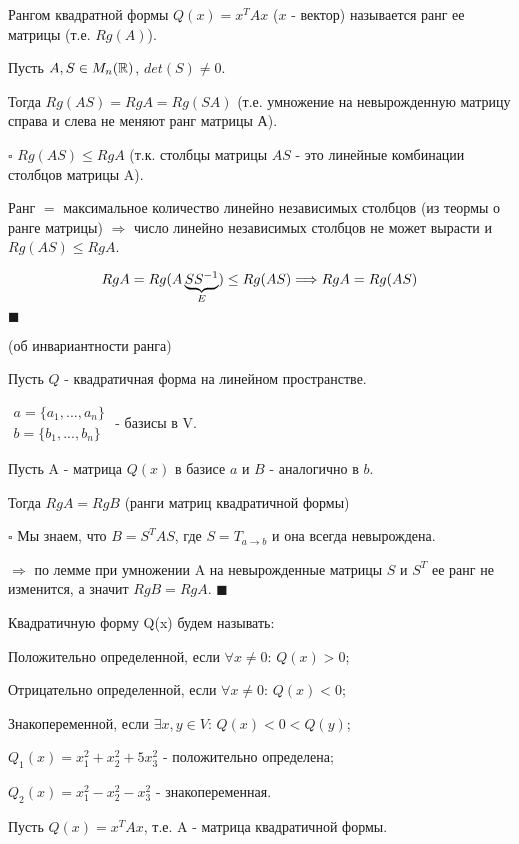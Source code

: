 \documentclass[../main.tex]{subfiles}
\begin{document}
\void{} Рангом квадратной формы $Q(x) = x^T A x$ ($x$ - вектор)
называется ранг ее матрицы (т.е. $Rg(A)$).

\void{} Пусть $A, S\in M_n(\mathbb{R})$, $det(S)\neq 0$.

Тогда $Rg(AS) = RgA = Rg(SA)$ (т.е. умножение на невырожденную матрицу справа и слева не меняют
ранг матрицы А).

\void $\square$ $Rg(AS)\leq RgA$ (т.к. столбцы матрицы $AS$ - это линейные комбинации столбцов матрицы A).

Ранг $=$ максимальное количество линейно независимых столбцов (из теормы о ранге матрицы) $\Longrightarrow$
число линейно независимых столбцов не может вырасти и $Rg(AS)\leq RgA$.

$$ RgA = Rg(A\underbrace{SS^{-1}}_{E})\leq Rg(AS) \Longrightarrow RgA = Rg(AS)$$
$\blacksquare$

\void{} (об инвариантности ранга)

Пусть $Q$ - квадратичная форма на линейном пространстве.

$\begin{matrix} a = \{a_1,...,a_n\}\\ b=\{b_1,...,b_n\} \end{matrix}$ - базисы в V.

Пусть A - матрица $Q(x)$ в базисе $a$ и $B$ - аналогично в $b$.

Тогда $RgA = RgB$ (ранги матриц квадратичной формы)

\void $\square$ Мы знаем, что $B = S^TAS$, где $S = T_{a\rightarrow b}$ и она всегда невырождена.

$\Longrightarrow$ по лемме при умножении A на невырожденные матрицы $S$ и $S^T$ ее ранг не изменится, а
значит $RgB = RgA$. $\blacksquare$

\void{} Квадратичную форму Q(x) будем называть:

\void{} Положительно определенной, если $\forall x\neq 0$: $Q(x) > 0$;

\void{} Отрицательно определенной, если $\forall x\neq 0$: $Q(x) < 0$;

\void{} Знакопеременной, если $\exists x,y\in V$: $Q(x) < 0 < Q(y)$;

\void{}

\void{} $Q_1(x) = x^2_1 + x^2_2 + 5x^2_3$ - положительно определена;

\void{} $Q_2(x) = x^2_1 - x^2_2 - x^2_3$ - знакопеременная.

\void
Пусть $Q(x) = x^TAx$, т.е. A - матрица квадратичной формы.
\end{document}

